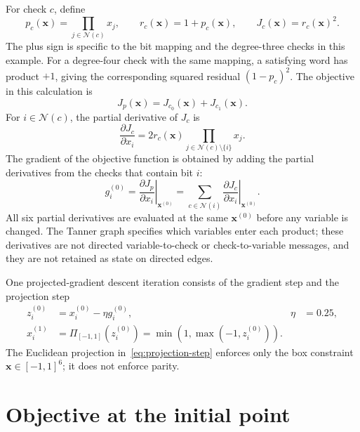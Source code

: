 \documentclass[11pt]{article}
\newcommand{\Ncal}{\mathcal{N}}
\newcommand{\proj}{\Pi_{[-1,1]}}
\begin{document}
For check \(c\), define
\begin{equation}
p_c(\boldsymbol{x})=\prod_{j\in\Ncal(c)}x_j,
\qquad
r_c(\boldsymbol{x})=1+p_c(\boldsymbol{x}),
\qquad
J_c(\boldsymbol{x})=r_c(\boldsymbol{x})^2.
\end{equation}
The plus sign is specific to the bit mapping and the degree-three checks in
this example.  For a degree-four check with the same mapping, a satisfying
word has product \(+1\), giving the corresponding squared residual
\((1-p_c)^2\).
The objective in this calculation is
\begin{equation}
J_p(\boldsymbol{x})=J_{c_0}(\boldsymbol{x})+J_{c_1}(\boldsymbol{x}).
\label{eq:objective}
\end{equation}
For \(i\in\Ncal(c)\), the partial derivative of \(J_c\) is
\begin{equation}
\frac{\partial J_c}{\partial x_i}
=2r_c(\boldsymbol{x})
 \prod_{j\in\Ncal(c)\setminus\{i\}}x_j.
\label{eq:check-derivative}
\end{equation}
The gradient of the objective function is obtained by adding the partial
derivatives from the checks that contain bit \(i\):
\begin{equation}
g_i^{(0)}=
\left.\frac{\partial J_p}{\partial x_i}\right|_{\boldsymbol{x}^{(0)}}
=\sum_{c\in\Ncal(i)}
 \left.\frac{\partial J_c}{\partial x_i}\right|_{\boldsymbol{x}^{(0)}}.
\label{eq:gradient}
\end{equation}
All six partial derivatives are evaluated at the same
\(\boldsymbol{x}^{(0)}\) before any variable is changed.  The Tanner graph
specifies which variables enter each product; these derivatives are not
directed variable-to-check or check-to-variable messages, and they are not
retained as state on directed edges.

One projected-gradient descent iteration consists of the gradient step and the
projection step
\begin{align}
z_i^{(0)}&=x_i^{(0)}-\eta g_i^{(0)},
&\eta&=0.25,
\label{eq:gradient-step}\\
x_i^{(1)}&=\proj\!\left(z_i^{(0)}\right)
=\min\!\left(1,\max(-1,z_i^{(0)})\right).
\label{eq:projection-step}
\end{align}
The Euclidean projection in~\eqref{eq:projection-step} enforces only the box
constraint \(\boldsymbol{x}\in[-1,1]^6\); it does not enforce parity.

\section{Objective at the initial point}
\end{document}
